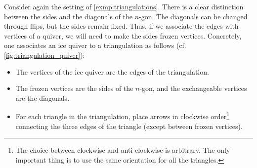 Consider again the setting of \cref{exmp:triangulations}. There is a clear distinction
between the sides and the diagonals of the $n$-gon. The diagonals can be changed
through flips, but the sides remain fixed. Thus, if we associate the edges with
vertices of a quiver, we will need to make the sides frozen vertices. Concretely, one
associates an ice quiver to a triangulation as follows (cf.
\cref{fig:triangulation_quiver}):
\begin{itemize}
	\item The vertices of the ice quiver are the edges of the triangulation.
	\item The frozen vertices are the sides of the $n$-gon, and the exchangeable vertices are the
	      diagonals.
	\item For each triangle in the triangulation, place arrows in clockwise order\footnote{The
		      choice between clockwise and anti-clockwise is arbitrary. The only important thing is
		      to use the same orientation for all the triangles.} connecting the three edges of the
	      triangle (except between frozen vertices).
\end{itemize}


